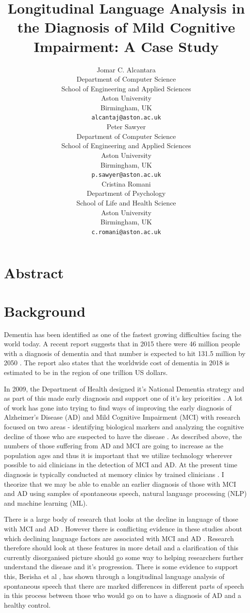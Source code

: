 \documentclass[10pt]{article}
\title{Longitudinal Language Analysis in the Diagnosis of Mild Cognitive Impairment: A Case Study}
\author{
  Jomar C. Alcantara \\
  Department of Computer Science \\
  School of Engineering and Applied Sciences\\
  Aston University\\
  Birmingham, UK \\
  \texttt{alcantaj@aston.ac.uk} \\
  \And
  Peter Sawyer \\
  Department of Computer Science \\
  School of Engineering and Applied Sciences \\
  Aston University\\
  Birmingham, UK \\
  \texttt{p.sawyer@aston.ac.uk} \\
  \And
  Cristina Romani \\
  Department of Psychology \\
  School of Life and Health Science\\
  Aston University\\
  Birmingham, UK \\
  \texttt{c.romani@aston.ac.uk} \\
}
\begin{document}
\maketitle
\section{Abstract}
\section{Background}
Dementia has been identified as one of the fastest growing difficulties facing the world today. A recent report suggests that in 2015 there were 46 million people with a diagnosis of dementia and that number is expected to hit 131.5 million by 2050 \cite{Prince2015}. The report also states that the worldwide cost of dementia in 2018 is estimated to be in the region of one trillion US dollars.
\par
In 2009, the Department of Health designed it's National Dementia strategy and as part of this made early diagnosis and support one of it's key priorities \cite{England2009}. A lot of work has gone into trying to find ways of improving the early diagnosis of Alzheimer's Disease (AD) and Mild Cognitive Impairment (MCI) with research focused on two areas - identifying biological markers and analyzing the cognitive decline of those who are suspected to have the disease \cite{Taler2008}. As described above, the numbers of those suffering from AD and MCI are going to increase as the population ages \cite{Prince2015} and thus it is important that we utilize technology wherever possible to aid clinicians in the detection of MCI and AD. At the present time diagnosis is typically conducted at memory clinics by trained clinicians \cite{Boschi2017}. I theorize that we may be able to enable an earlier diagnosis of those with MCI and AD using samples of spontaneous speech, natural language processing (NLP) and machine learning (ML).
\par
There is a large body of research that looks at the decline in language of those with MCI and AD \cite{Taler2008, Boschi2017}. However there is conflicting evidence in these studies about which declining language factors are associated with MCI and AD \cite{Taler2008, Boschi2017}. Research therefore should look at these features in more detail and a clarification of this currently disorganised picture should go some way to helping researchers further understand the disease and it's progression. There is some evidence to support this, Berisha et al \cite{Berisha2015}, has shown through a longitudinal language analysis of spontaneous speech that there are marked differences in different parts of speech in this process between those who would go on to have a diagnosis of AD and a healthy control. 
\end{document}
